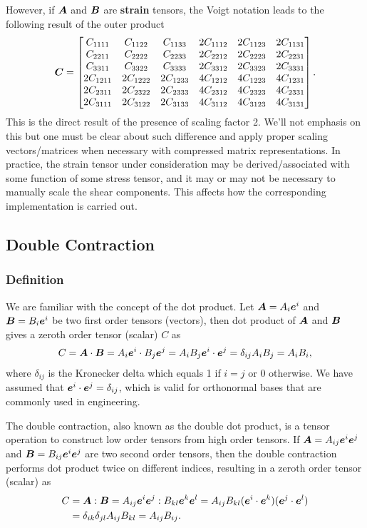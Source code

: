 However, if $\bm{A}$ and $\bm{B}$ are \textbf{strain} tensors, the Voigt notation leads to the following result of the outer product
\begin{gather}
\bm{C}=\begin{bmatrix}
C_{1111}&C_{1122}&C_{1133}&2C_{1112}&2C_{1123}&2C_{1131}\\
C_{2211}&C_{2222}&C_{2233}&2C_{2212}&2C_{2223}&2C_{2231}\\
C_{3311}&C_{3322}&C_{3333}&2C_{3312}&2C_{3323}&2C_{3331}\\
2C_{1211}&2C_{1222}&2C_{1233}&4C_{1212}&4C_{1223}&4C_{1231}\\
2C_{2311}&2C_{2322}&2C_{2333}&4C_{2312}&4C_{2323}&4C_{2331}\\
2C_{3111}&2C_{3122}&2C_{3133}&4C_{3112}&4C_{3123}&4C_{3131}
\end{bmatrix}.
\end{gather}
This is the direct result of the presence of scaling factor \num{2}.
We'll not emphasis on this but one must be clear about such difference and apply proper scaling vectors/matrices when necessary with compressed matrix representations.
In practice, the strain tensor under consideration may be derived/associated with some function of some stress tensor, and it may or may not be necessary to manually scale the shear components.
This affects how the corresponding implementation is carried out.
\subsection{Double Contraction}
\subsubsection{Definition}
We are familiar with the concept of the dot product. Let $\bm{A}=A_i\bm{e}^i$ and $\bm{B}=B_i\bm{e}^i$ be two first order tensors (vectors), then dot product of $\bm{A}$ and $\bm{B}$ gives a zeroth order tensor (scalar) $C$ as
\begin{gather}
C=\bm{A}\cdot\bm{B}=A_i\bm{e}^i\cdot{}B_j\bm{e}^j=A_iB_j\bm{e}^i\cdot\bm{e}^j=\delta_{ij}A_iB_j=A_iB_i,
\end{gather}
where $\delta_{ij}$ is the Kronecker delta which equals \num{1} if $i=j$ or \num{0} otherwise.
We have assumed that $\bm{e}^i\cdot\bm{e}^j=\delta_{ij}$, which is valid for orthonormal bases that are commonly used in engineering.

The double contraction, also known as the double dot product, is a tensor operation to construct low order tensors from high order tensors.
If $\bm{A}=A_{ij}\bm{e}^i\bm{e}^j$ and $\bm{B}=B_{ij}\bm{e}^i\bm{e}^j$ are two second order tensors, then the double contraction performs dot product twice on different indices, resulting in a zeroth order tensor (scalar) as
\begin{gather}\label{eq:double_contraction}
\begin{split}
C&=\bm{A}:\bm{B}=A_{ij}\bm{e}^i\bm{e}^j:B_{kl}\bm{e}^k\bm{e}^l=A_{ij}B_{kl}(\bm{e}^i\cdot\bm{e}^k)(\bm{e}^j\cdot\bm{e}^l)\\&=\delta_{ik}\delta_{jl}A_{ij}B_{kl}=A_{ij}B_{ij}.
\end{split}
\end{gather}

